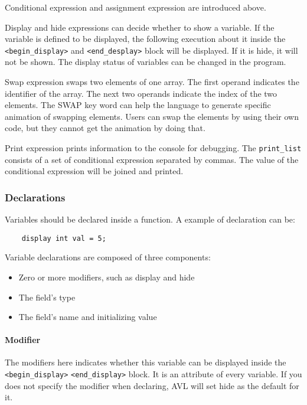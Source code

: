 Conditional expression and assignment expression are introduced above.

Display and hide expressions can decide whether to show a variable. If the variable is defined to be
displayed, the following execution about it inside the \verb"<begin_display>" and
\verb"<end_desplay>" block will be displayed. If it is hide, it will not be shown. The display
status of variables can be changed in the program.

Swap expression swaps two elements of one array. The first operand indicates the identifier of the
array. The next two operands indicate the index of the two elements.  The SWAP key word can help the
language to generate specific animation of swapping elements. Users can swap the elements by using
their own code, but they cannot get the animation by doing that.

Print expression prints information to the console for debugging. The \verb"print_list" consists of
a set of conditional expression separated by commas. The value of the conditional expression will be
joined and printed.

\subsubsection{Declarations}

Variables should be declared inside a function. A example of declaration can be:

\begin{verbatim}
    display int val = 5;
\end{verbatim}

Variable declarations are composed of three components:
\begin{itemize}
  \item Zero or more modifiers, such as display and hide
  \item The field’s type
  \item The field’s name and initializing value
\end{itemize}

\paragraph{Modifier}
The modifiers here indicates whether this variable can be displayed inside the
\verb"<begin_display>" \verb"<end_display>" block. It is an attribute of every variable. If you does
not specify the modifier when declaring, AVL will set hide as the default for it.

